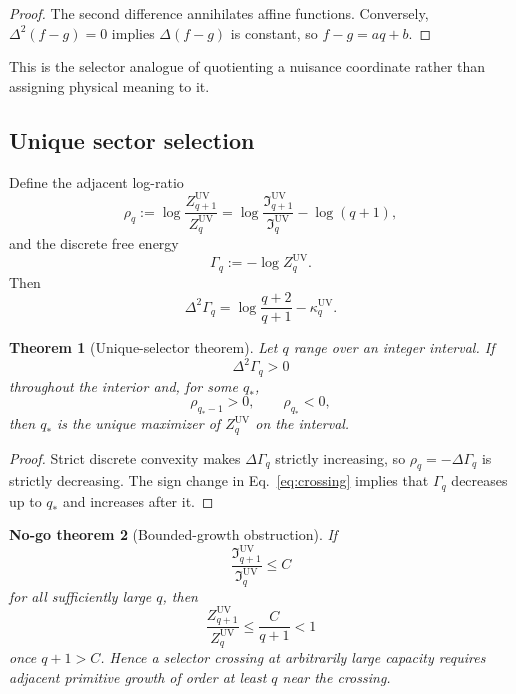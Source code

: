 \documentclass[aps,prd,preprint,nofootinbib,superscriptaddress]{revtex4-2}
\newtheorem{theorem}{Theorem}[section]
\newtheorem{nogotheorem}[theorem]{No-go theorem}
\theoremstyle{definition}
\theoremstyle{remark}
\newcommand{\UV}{\mathrm{UV}}
\newcommand{\cI}{\mathfrak I}
\begin{document}
\begin{proof}
The second difference annihilates affine functions.  Conversely,
$\Delta^2(f-g)=0$ implies $\Delta(f-g)$ is constant, so $f-g=aq+b$.
\end{proof}

This is the selector analogue of quotienting a nuisance coordinate rather than assigning physical meaning to it.

\subsection{Unique sector selection}

Define the adjacent log-ratio
\begin{equation}
\rho_q
:=
\log\frac{Z_{q+1}^{\UV}}{Z_q^{\UV}}
=
\log\frac{\cI_{q+1}^{\UV}}{\cI_q^{\UV}}
-\log(q+1),
\label{eq:rho}
\end{equation}
and the discrete free energy
\begin{equation}
\Gamma_q:=-\log Z_q^{\UV}.
\end{equation}
Then
\begin{equation}
\Delta^2\Gamma_q
=
\log\frac{q+2}{q+1}
-
\kappa_q^{\UV}.
\label{eq:freecurvature}
\end{equation}

\begin{theorem}[Unique-selector theorem]
\label{thm:unique}
Let $q$ range over an integer interval.  If
\begin{equation}
\Delta^2\Gamma_q>0
\label{eq:strictconvex}
\end{equation}
throughout the interior and, for some $q_*$,
\begin{equation}
\rho_{q_*-1}>0,
\qquad
\rho_{q_*}<0,
\label{eq:crossing}
\end{equation}
then $q_*$ is the unique maximizer of $Z_q^{\UV}$ on the interval.
\end{theorem}

\begin{proof}
Strict discrete convexity makes $\Delta\Gamma_q$ strictly increasing, so $\rho_q=-\Delta\Gamma_q$ is strictly decreasing.  The sign change in Eq.~\eqref{eq:crossing} implies that $\Gamma_q$ decreases up to $q_*$ and increases after it.
\end{proof}

\begin{nogotheorem}[Bounded-growth obstruction]
\label{thm:boundedgrowth}
If
\begin{equation}
\frac{\cI_{q+1}^{\UV}}{\cI_q^{\UV}}\le C
\label{eq:boundedgrowth}
\end{equation}
for all sufficiently large $q$, then
\begin{equation}
\frac{Z_{q+1}^{\UV}}{Z_q^{\UV}}
\le
\frac{C}{q+1}<1
\end{equation}
once $q+1>C$.  Hence a selector crossing at arbitrarily large capacity requires adjacent primitive growth of order at least $q$ near the crossing.
\end{nogotheorem}
\end{document}
